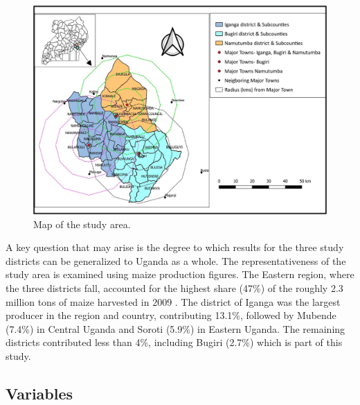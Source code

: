\documentclass[12pt,english]{article}\usepackage[]{graphicx}\usepackage[]{color}
\begin{document}
\begin{figure}
\centering{}\includegraphics[scale=0.5]{map_outlined.jpg}\caption{Map of the study area.\label{fig:Map-of-the-study-area}}
\end{figure}

\begin{onehalfspace}
A key question that may arise is the degree to which results for the
three study districts can be generalized to Uganda as a whole. The
representativeness of the study area is examined using maize production
figures. The Eastern region, where the three districts fall, accounted
for the highest share (47\%) of the roughly 2.3 million tons of maize
harvested in 2009 \citep{Daly2016}. The district of Iganga was the
largest producer in the region and country, contributing 13.1\%, followed
by Mubende (7.4\%) in Central Uganda and Soroti (5.9\%) in Eastern
Uganda. The remaining districts contributed less than 4\%, including
Bugiri (2.7\%) which is part of this study.
\end{onehalfspace}

\newpage{}
\begin{onehalfspace}

\subsection{Variables\label{subsec:Variables} }
\end{onehalfspace}
\end{document}
